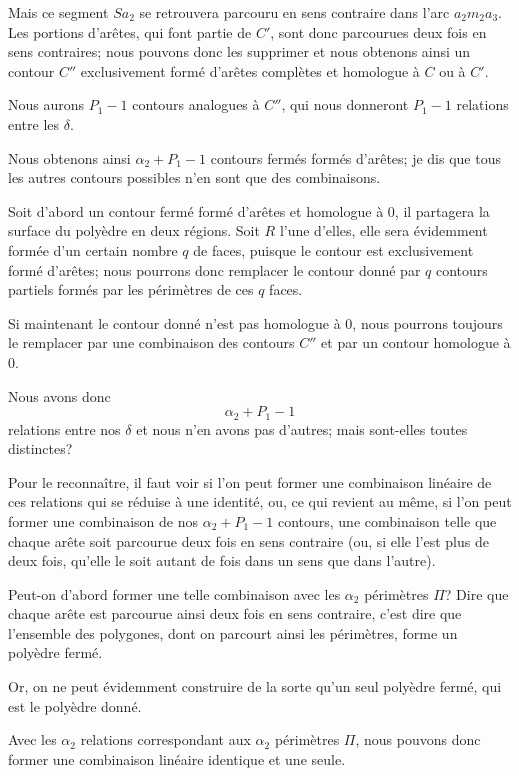 \documentclass{article}
\begin{document}
Mais ce segment $Sa_{2}$ se retrouvera parcouru en sens contraire dans l'arc $a_{2}m_{2}a_{3}$. Les portions d'arêtes, qui font partie de $C'$, sont donc parcourues deux fois en sens contraires; nous pouvons donc les supprimer et nous obtenons ainsi un contour $C''$ exclusivement formé d'arêtes complètes et homologue à $C$ ou à $C'$.

Nous aurons $P_{1} - 1$ contours analogues à $C''$, qui nous donneront $P_{1} - 1$ relations entre les $\delta$.

Nous obtenons ainsi $\alpha_{2} + P_{1} - 1$ contours fermés formés d'arêtes; je dis que tous les autres contours possibles n'en sont que des combinaisons.

Soit d'abord un contour fermé formé d'arêtes et homologue à 0, il
partagera la surface du polyèdre en deux régions. Soit $R$ l'une d'elles, elle sera évidemment formée d'un certain nombre $q$ de faces, puisque le contour est exclusivement formé d'arêtes; nous pourrons donc remplacer le contour donné par $q$ contours partiels formés par les périmètres de ces $q$ faces.

Si maintenant le contour donné n'est pas homologue à 0, nous pourrons toujours le remplacer par une combinaison des contours $C''$ et par un contour homologue à 0.

Nous avons donc
\[ \alpha_{2} + P_{1} - 1 \]
relations entre nos $\delta$ et nous n'en avons pas d'autres; mais sont-elles toutes distinctes?

Pour le reconnaître, il faut voir si l'on peut former une combinaison linéaire de ces relations qui se réduise à une identité, ou, ce qui revient au même, si l'on peut former une combinaison de nos $\alpha_{2} + P_{1} - 1$ contours, une combinaison telle que chaque arête soit parcourue deux fois en sens contraire (ou, si elle l'est plus de deux fois, qu'elle le soit autant de fois dans un sens que dans l'autre).

Peut-on d'abord former une telle combinaison avec les $\alpha_{2}$ périmètres $\Pi$? Dire que chaque arête est parcourue ainsi deux fois en sens contraire, c'est dire que l'ensemble des polygones, dont on parcourt ainsi les périmètres, forme un polyèdre fermé.

Or, on ne peut évidemment construire de la sorte qu'un seul polyèdre fermé, qui est le polyèdre donné.

Avec les $\alpha_{2}$ relations correspondant aux $\alpha_{2}$ périmètres $\Pi$, nous pouvons donc former une combinaison linéaire identique et une seule.
\end{document}
